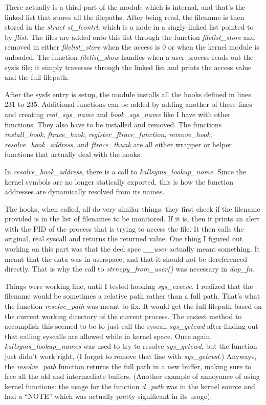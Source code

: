 \documentclass[letterpaper,12pt]{article}
\begin{document}
There actually is a third part of the module which is internal, and that's the linked list that stores all the filepaths. After being read, the filename is then stored in the \textit{struct st\_fcontrl}, which is a node in a singly-linked list pointed to by \textit{flist}. The files are added onto this list through the function \textit{filelist\_store} and removed in either \textit{filelist\_store} when the access is 0 or when the kernel module is unloaded. The function \textit{filelist\_show} handles when a user process reads out the sysfs file; it simply traverses through the linked list and prints the access value and the full filepath.

After the sysfs entry is setup, the module installs all the hooks defined in lines 231 to 235. Additional functions can be added by adding another of these lines and creating \textit{real\_sys\_name} and \textit{hook\_sys\_name} like I have with other functions. They also have to be installed and removed. The functions \textit{install\_hook}, \textit{ftrace\_hook}, \textit{register\_ftrace\_function}, \textit{remove\_hook}, \textit{resolve\_hook\_address}, and \textit{ftrace\_thunk} are all either wrapper or helper functions that actually deal with the hooks.

In \textit{resolve\_hook\_address}, there is a call to \textit{kallsyms\_lookup\_name}. Since the kernel symbols are no longer statically exported, this is how the function addresses are dynamically resolved from its names.

The hooks, when called, all do very similar things: they first check if the filename provided is in the list of filenames to be monitored. If it is, then it prints an alert with the PID of the process that is trying to access the file. It then calls the original, real syscall and returns the returned value. One thing I figured out working on this part was that the decl spec \textit{\_\_user} actually meant something. It meant that the data was in userspace, and that it should not be dereferenced directly. That is why the call to \textit{strncpy\_from\_user()} was necessary in \textit{dup\_fn}.

Things were working fine, until I tested hooking \textit{sys\_execve}. I realized that the filename would be sometimes a relative path rather than a full path. That's what the function \textit{resolve\_path} was meant to fix. It would get the full filepath based on the current working directory of the current process. The easiest method to accomplish this seemed to be to just call the syscall \textit{sys\_getcwd} after finding out that calling syscalls are allowed while in kernel space. Once again, \textit{kallsyms\_lookup\_names} was used to try to resolve \textit{sys\_getcwd}, but the function just didn't work right. (I forgot to remove that line with \textit{sys\_getcwd}.) Anyways, the \textit{resolve\_path} function returns the full path in a new buffer, making sure to free all the old and intermediate buffers. (Another example of annoyance of using kernel functions: the usage for the function \textit{d\_path} was in the kernel source and had a ``NOTE'' which was actually pretty significant in its usage).
\end{document}
